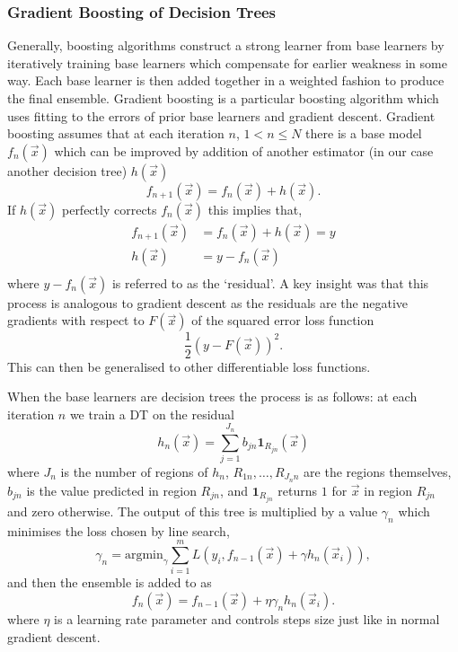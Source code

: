 \subsubsection{Gradient Boosting of Decision Trees}
Generally, boosting algorithms construct a strong learner from base learners by iteratively training base learners which compensate for earlier weakness in some way. Each base learner is then added together in a weighted fashion to produce the final ensemble.
Gradient boosting is a particular boosting algorithm which uses fitting to the errors of prior base learners and gradient descent. Gradient boosting assumes that at each iteration $n$, $1<n\leq{N}$ there is a base model $f_{n}(\vec{x})$ which can be improved by addition of another estimator (in our case another decision tree) $h(\vec{x})$
\begin{equation}
    f_{n+1}(\vec{x}) = f_{n}(\vec{x}) + h(\vec{x}).
\end{equation}
If $h(\vec{x})$ perfectly corrects $f_{n}(\vec{x})$ this implies that,
\begin{equation}
    \begin{split}
        f_{n+1}(\vec{x}) &= f_{n}(\vec{x}) + h(\vec{x}) = y \\
        h(\vec{x}) &= y - f_{n}(\vec{x}) \\
    \end{split}
\end{equation}
where $y - f_{n}(\vec{x})$ is referred to as the `residual'. A key insight was that this process is analogous to gradient descent as the residuals are the negative gradients with respect to $F(\vec{x})$ of the squared error loss function
\begin{equation}
    \frac{1}{2}(y-F(\vec{x}))^{2}.
\end{equation}
This can then be generalised to other differentiable loss functions. 

When the base learners are decision trees the process is as follows: at each iteration $n$ we train a DT on the residual 
\begin{equation}
    h_{n}(\vec{x}) = \sum_{j=1}^{J_{n}}b_{jn}\mathbf{1}_{R_{jn}}(\vec{x})
\end{equation}
where $J_n$ is the number of regions of $h_{n}$, $R_{1n},\dots,R_{J_{n}n}$ are the regions themselves, $b_{jn}$ is the value predicted in region $R_{jn}$, and $\mathbf{1}_{R_{jn}}$ returns $1$ for $\vec{x}$ in region $R_{jn}$ and zero otherwise. 
The output of this tree is multiplied by a value $\gamma_{n}$ which minimises the loss chosen by line search,
\begin{equation}
    \gamma_{n} = \mathrm{argmin}_{\gamma}\sum_{i=1}^{m}L(y_{i},f_{n-1}(\vec{x})+\gamma{}h_{n}(\vec{x}_{i})),
\end{equation}
and then the ensemble is added to as
\begin{equation}
    f_{n}(\vec{x}) = f_{n-1}(\vec{x}) +\eta\gamma_{n}h_{n}(\vec{x}_{i}).
\end{equation}
where $\eta$ is a learning rate parameter and controls steps size just like in normal gradient descent. 




